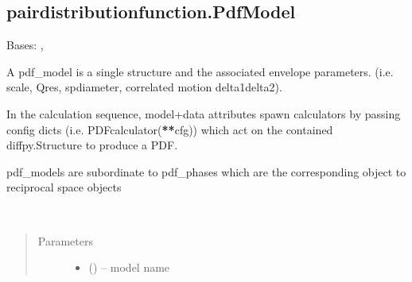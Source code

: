 \documentclass[letterpaper,10pt,english]{sphinxmanual}
\begin{document}
\subsection{pairdistributionfunction.PdfModel}
\label{\detokenize{rst/pairdistributionfunction:pairdistributionfunction-pdfmodel}}

\begin{fulllineitems}
\label{\detokenize{rst/pairdistributionfunction:mstack.pairdistributionfunction.PdfModel}}
Bases: {\hyperref[\detokenize{rst/utilities:mstack.utilities.UpdateMethods}]{}}, {\hyperref[\detokenize{rst/utilities:mstack.utilities.MergeParams}]{}}

A pdf\_model is a single structure and the associated envelope parameters.
(i.e. scale, Qres, spdiameter, correlated motion delta1\textbar{}delta2).

In the calculation sequence, model+data attributes spawn calculators by passing
config dicts (i.e. PDFcalculator({\color{red}\bfseries{}**}cfg)) which act on the contained diffpy.Structure
to produce a PDF.

pdf\_models are subordinate to pdf\_phases which are the corresponding object to
reciprocal space objects

\begin{fulllineitems}
\label{\detokenize{rst/pairdistributionfunction:mstack.pairdistributionfunction.PdfModel.__init__}}~\begin{quote}\begin{description}
\item[{Parameters}] \leavevmode\begin{itemize}
\item {} 
 () -- model name


\end{itemize}
\end{description}
\end{quote}
\end{fulllineitems}
\end{fulllineitems}
\end{document}
